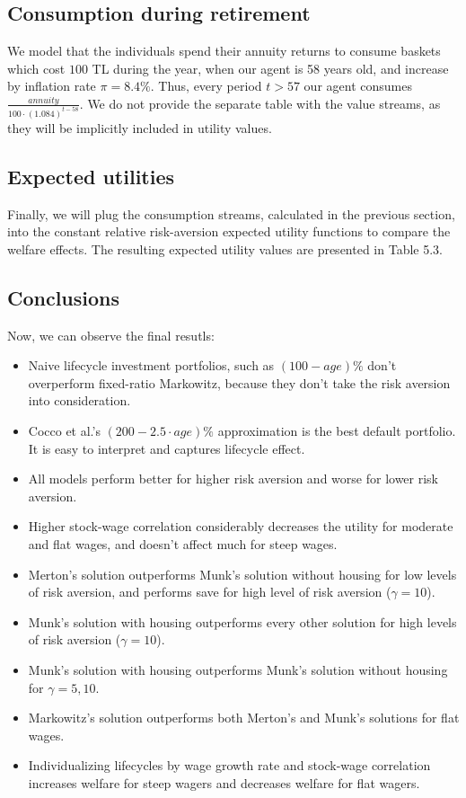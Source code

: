 \subsection{Consumption during retirement}
We model that the individuals spend their annuity returns to consume baskets which cost $100$ TL during the year, when our agent is 58 years old, and increase by inflation rate $\pi = 8.4\%$. Thus, every period $t>57$ our agent consumes $\frac{annuity}{100\cdot\left(1.084\right)^{t-58}}$. We do not provide the separate table with the value streams, as they will be implicitly included in utility values.

\subsection{Expected utilities}
Finally, we will plug the consumption streams, calculated in the previous section, into the constant relative risk-aversion expected utility functions to compare the welfare effects. The resulting expected utility values are presented in Table 5.3.

\subsection{Conclusions}
Now, we can observe the final resutls:

\begin{itemize}

\item Naive lifecycle investment portfolios, such as $(100-age)\%$ don't overperform fixed-ratio Markowitz, because they don't take the risk aversion into consideration.
\item Cocco et al.'s $(200-2.5\cdot age)\%$ approximation is the best default portfolio. It is easy to interpret and captures lifecycle effect.
\item All models perform better for higher risk aversion and worse for lower risk aversion.
\item Higher stock-wage correlation considerably decreases the utility for moderate and flat wages, and doesn't affect much for steep wages.
\item Merton's solution outperforms Munk's solution without housing for low levels of risk aversion, and performs save for high level of risk aversion ($\gamma=10$).
\item Munk's solution with housing outperforms every other solution for high levels of risk aversion ($\gamma=10$).
\item Munk's solution with housing outperforms Munk's solution without housing for $\gamma=5,10$.
\item Markowitz's solution outperforms both Merton's and Munk's solutions for flat wages.
\item Individualizing lifecycles by wage growth rate and stock-wage correlation increases welfare for steep wagers and decreases welfare for flat wagers.
\end{itemize}

